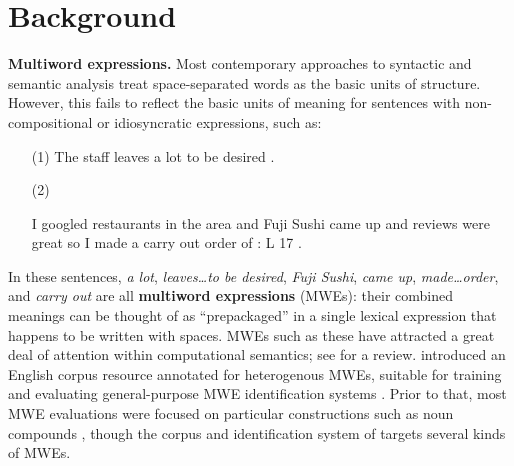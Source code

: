 \documentclass[11pt,letterpaper]{article}
\newcommand{\lex}[1]{\textit{#1}} %
\begin{document}


\section{Background}\label{sec:integration}
\textbf{Multiword expressions.} 
Most contemporary approaches to syntactic and semantic analysis
treat space-separated words as the basic units of structure. 
However, this fails to reflect 
the basic units of meaning for sentences with non-compositional or idiosyncratic expressions, such as:
\begin{itemize}[labelindent=2em]
\item[(1)] The staff {\color{red}leaves} {\color{blue}a lot} {\color{red}to be desired} .
\item[(2)] \raggedright I googled restaurants in the area and {\color{red}Fuji Sushi} {\color{blue}came up} and reviews were great so I {\color{mdgreen}made a} {\color{orange}carry out} {\color{mdgreen}order} of : L 17 .
\end{itemize}
In these sentences, \lex{a lot}, \lex{leaves\ldots to be desired}, 
\lex{Fuji Sushi}, \lex{came up}, \lex{made\ldots order}, and \lex{carry out}
are all \textbf{multiword expressions} (MWEs): their combined meanings can be thought of as ``prepackaged'' 
in a single lexical expression that happens to be written with spaces.
MWEs such as these have attracted a great deal of attention 
within computational semantics; see \citet{baldwin-10} for a review.
 introduced an English corpus resource annotated for heterogenous MWEs, 
suitable for training and evaluating general-purpose MWE identification systems \citep{schneider-14}.
Prior to that, most MWE evaluations were focused on particular constructions such as noun compounds \citep[recently:][]{constant-11,green-12,ramisch-12,vincze-13},
though the corpus and identification system of \citet{vincze-11} targets several kinds of MWEs.
\end{document}
